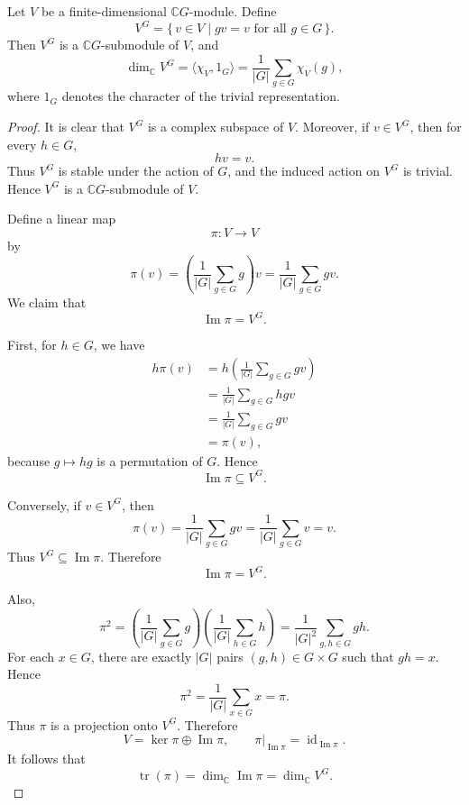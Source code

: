 \begin{lemma}
    Let \(V\) be a finite-dimensional \(\mathbb{C}G\)-module. Define
    \[
        V^G
        =
        \{\,v\in V\mid gv=v \text{ for all } g\in G\,\}.
    \]
    Then \(V^G\) is a \(\mathbb{C}G\)-submodule of \(V\), and
    \[
        \dim_{\mathbb{C}} V^G
        =
        \langle \chi_V,1_G\rangle
        =
        \frac{1}{|G|}
        \sum_{g\in G}\chi_V(g),
    \]
    where \(1_G\) denotes the character of the trivial representation.
\end{lemma}

\begin{proof}
    It is clear that \(V^G\) is a complex subspace of \(V\). Moreover, if
    \(v\in V^G\), then for every \(h\in G\),
    \[
        hv=v.
    \]
    Thus \(V^G\) is stable under the action of \(G\), and the induced action on
    \(V^G\) is trivial. Hence \(V^G\) is a \(\mathbb{C}G\)-submodule of \(V\).

    Define a linear map
    \[
        \pi:V\longrightarrow V
    \]
    by
    \[
        \pi(v)
        =
        \left(
        \frac{1}{|G|}
        \sum_{g\in G}g
        \right)v
        =
        \frac{1}{|G|}
        \sum_{g\in G}gv.
    \]
    We claim that
    \[
        \operatorname{Im}\pi=V^G.
    \]

    First, for \(h\in G\), we have
    \[
        \begin{aligned}
            h\pi(v)
             & =
            h\left(
            \frac{1}{|G|}
            \sum_{g\in G}gv
            \right)          \\
             & =
            \frac{1}{|G|}
            \sum_{g\in G}hgv \\
             & =
            \frac{1}{|G|}
            \sum_{g\in G}gv  \\
             & =
            \pi(v),
        \end{aligned}
    \]
    because \(g\mapsto hg\) is a permutation of \(G\). Hence
    \[
        \operatorname{Im}\pi\subseteq V^G.
    \]

    Conversely, if \(v\in V^G\), then
    \[
        \pi(v)
        =
        \frac{1}{|G|}
        \sum_{g\in G}gv
        =
        \frac{1}{|G|}
        \sum_{g\in G}v
        =
        v.
    \]
    Thus \(V^G\subseteq \operatorname{Im}\pi\). Therefore
    \[
        \operatorname{Im}\pi=V^G.
    \]

    Also,
    \[
        \pi^2
        =
        \left(
        \frac{1}{|G|}
        \sum_{g\in G}g
        \right)
        \left(
        \frac{1}{|G|}
        \sum_{h\in G}h
        \right)
        =
        \frac{1}{|G|^2}
        \sum_{g,h\in G}gh.
    \]
    For each \(x\in G\), there are exactly \(|G|\) pairs \((g,h)\in G\times G\)
    such that \(gh=x\). Hence
    \[
        \pi^2
        =
        \frac{1}{|G|}
        \sum_{x\in G}x
        =
        \pi.
    \]
    Thus \(\pi\) is a projection onto \(V^G\). Therefore
    \[
        V=\ker\pi\oplus \operatorname{Im}\pi,
        \qquad
        \pi|_{\operatorname{Im}\pi}=\operatorname{id}_{\operatorname{Im}\pi}.
    \]
    It follows that
    \[
        \operatorname{tr}(\pi)=\dim_{\mathbb{C}}\operatorname{Im}\pi
        =
        \dim_{\mathbb{C}}V^G.
    \]


\end{proof}
